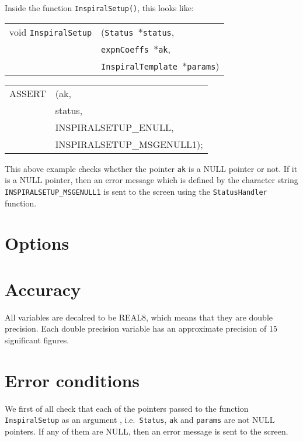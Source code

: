\documentclass[12pt]{article}
\begin{document}
Inside the function \texttt{InspiralSetup()}, this looks like:

\vspace{5mm}

\begin{tabular}{ll}
void \texttt{InspiralSetup}&(\texttt{Status $\ast$status},     \\
                                   &\texttt{expnCoeffs $\ast$ak}, \\
                                   &\texttt{InspiralTemplate $\ast$params})
\end{tabular}

\vspace{5mm}

\begin{tabular}{ll}
ASSERT & (ak,  \\
       &  status,    \\
       &  INSPIRALSETUP\_ENULL, \\
       &  INSPIRALSETUP\_MSGENULL1);
\end{tabular}

\vspace{5mm}

This above example checks whether the pointer \texttt{ak} is a NULL pointer or not. If it is a NULL pointer, then an error message which is defined by the character string \texttt{INSPIRALSETUP\_MSGENULL1} is sent to the screen using the \texttt{StatusHandler} function.


\section{Options}

 

\section{Accuracy}

All variables are decalred to be REAL8, which means that they are double precision.
Each double precision variable has an approximate precision of 15 significant figures.



\section{Error conditions}

We first of all check that each of the pointers passed to the function \\ \texttt{InspiralSetup} as an argument , i.e.\ \texttt{Status}, \texttt{ak} and \texttt{params} are not NULL pointers. If any of them are NULL, then an error message is sent to the screen.
\end{document}
